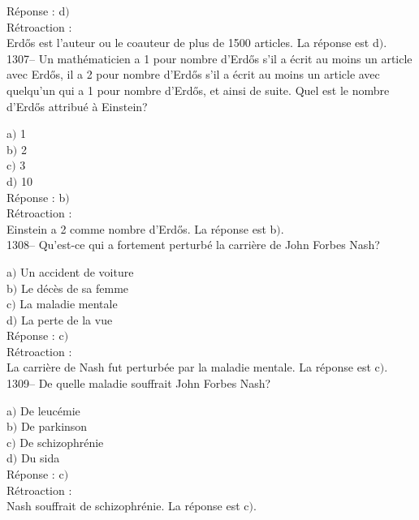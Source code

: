 ﻿\documentclass[letterpaper, 12pt]{article}
\begin{document}
R\'eponse : d$)$\\

R\'etroaction : \\
Erd\H{o}s est l'auteur ou le coauteur de plus de 1500 articles.
La r\'eponse est  d$)$.\\

1307-- Un math\'ematicien a 1 pour nombre d'Erd\H{o}s s'il a \'ecrit
au moins un article avec Erd\H{o}s, il a 2 pour nombre d'Erd\H{o}s
s'il a \'ecrit au moins un article avec quelqu'un qui a 1 pour
nombre d'Erd\H{o}s, et ainsi de suite. Quel est le nombre
d'Erd\H{o}s attribu\'e \`a Einstein?

a$)$ 1 \\
b$)$ 2 \\
c$)$ 3 \\
d$)$ 10\\

R\'eponse : b$)$\\

R\'etroaction : \\
Einstein a 2 comme nombre d'Erd\H{o}s.
La r\'eponse est  b$)$.\\

1308-- Qu'est-ce qui a fortement perturb\'e la carri\`ere de John
Forbes Nash?

a$)$ Un accident de voiture \\
b$)$ Le d\'ec\`es de sa femme \\
c$)$ La maladie mentale \\
d$)$ La perte de la vue\\

R\'eponse : c$)$\\

R\'etroaction : \\
La carri\`ere de Nash fut perturb\'ee par la maladie mentale.
La r\'eponse est  c$)$.\\

1309-- De quelle maladie souffrait John Forbes Nash?

a$)$ De leuc\'emie \\
b$)$ De parkinson \\
c$)$ De schizophr\'enie \\
d$)$ Du sida\\

R\'eponse : c$)$\\

R\'etroaction : \\
Nash souffrait de schizophr\'enie.
La r\'eponse est  c$)$.\\
\end{document}
